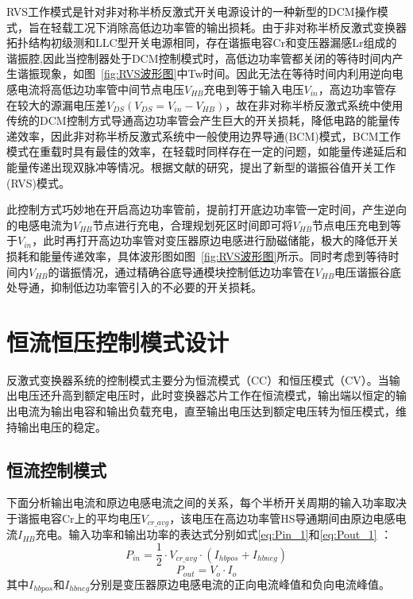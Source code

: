 RVS工作模式是针对非对称半桥反激式开关电源设计的一种新型的DCM操作模式，旨在轻载工况下消除高低边功率管的输出损耗。由于非对称半桥反激式变换器拓扑结构初级测和LLC型开关电源相同，存在谐振电容Cr和变压器漏感Lr组成的谐振腔,因此当控制器处于DCM控制模式时，高低边功率管都关闭的等待时间内产生谐振现象，如图~\ref{fig:RVS波形图}中Tw时间。因此无法在等待时间内利用逆向电感电流将高低边功率管中间节点电压$V_{HB}$充电到等于输入电压$V_{in}$，高边功率管存在较大的源漏电压差$V_{DS}(V_{DS}=V_{in}-V_{HB})$，故在非对称半桥反激式系统中使用传统的DCM控制方式导通高边功率管会产生巨大的开关损耗，降低电路的能量传递效率，因此非对称半桥反激式系统中一般使用边界导通(BCM)模式，BCM工作模式在重载时具有最佳的效率，在轻载时同样存在一定的问题，如能量传递延后和能量传递出现双脉冲等情况。根据文献的研究，提出了新型的谐振谷值开关工作(RVS)模式。

此控制方式巧妙地在开启高边功率管前，提前打开底边功率管一定时间，产生逆向的电感电流为$V_{HB}$节点进行充电，合理规划死区时间即可将$V_{HB}$节点电压充电到等于$V_{in}$，此时再打开高边功率管对变压器原边电感进行励磁储能，极大的降低开关损耗和能量传递效率，具体波形图如图~\ref{fig:RVS波形图}所示。同时考虑到等待时间内$V_{HB}$的谐振情况，通过精确谷底导通模块控制低边功率管在$V_{HB}$电压谐振谷底处导通，抑制低边功率管引入的不必要的开关损耗。

\section{恒流恒压控制模式设计}
反激式变换器系统的控制模式主要分为恒流模式（CC）和恒压模式（CV）。当输出电压还升高到额定电压时，此时变换器芯片工作在恒流模式，输出端以恒定的输出电流为输出电容和输出负载充电，直至输出电压达到额定电压转为恒压模式，维持输出电压的稳定。
\subsection{恒流控制模式}

下面分析输出电流和原边电感电流之间的关系，每个半桥开关周期的输入功率取决于谐振电容Cr上的平均电压$V_{cr\_avg}$，该电压在高边功率管HS导通期间由原边电感电流$I_{HB}$充电。输入功率和输出功率的表达式分别如式\eqref{eq:Pin_1}和\eqref{eq:Pout_1} ：
\begin{equation}
    \label{eq:Pin_1}
    P_{in}=\frac{1}{2} \cdot V_{cr\_avg} \cdot (I_{hbpos}+I_{hbneg})
\end{equation}
\begin{equation}
    \label{eq:Pout_1}
    P_{out}=V_o \cdot I_o
\end{equation}
其中$I_{hbpos}$和$I_{hbneg}$分别是变压器原边电感电流的正向电流峰值和负向电流峰值。

